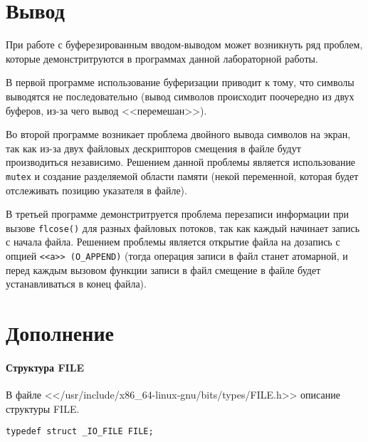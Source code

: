 

\chapter*{Вывод}

При работе с буферезированным вводом-выводом может возникнуть ряд проблем, которые демонстритруются в программах данной лабораторной работы. 

В первой программе использование буферизации приводит к тому, что символы выводятся не последовательно (вывод символов происходит поочередно из двух буферов, из-за чего вывод <<перемешан>>).

Во второй программе возникает проблема двойного вывода символов на экран, так как из-за двух файловых дескрипторов смещения в файле будут производиться независимо. Решением данной проблемы является использование \texttt{mutex} и создание разделяемой области памяти (некой переменной, которая будет отслеживать позицию указателя в файле).

В третьей программе демонстритруется проблема перезаписи информации при вызове \texttt{flcose()} для разных файловых потоков, так как каждый начинает запись с начала файла. Решением проблемы является открытие файла на дозапись с опцией \texttt{<<a>> (O\_APPEND)} (тогда операция записи в файл станет атомарной, и перед каждым вызовом функции записи в файл смещение в файле будет устанавливаться в конец файла).


\chapter*{Дополнение}

\subsubsection{Структура FILE}

В файле <</usr/include/x86\_64-linux-gnu/bits/types/FILE.h>> описание структуры FILE.

\begin{lstlisting}
typedef struct _IO_FILE FILE;
\end{lstlisting}


